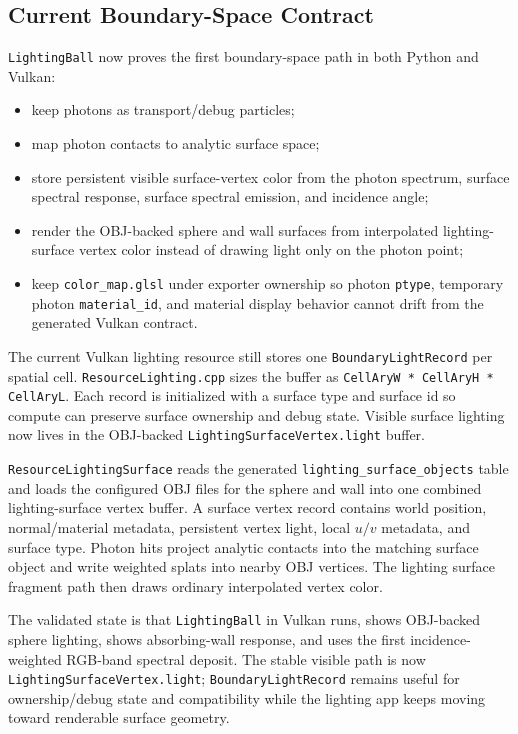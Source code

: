 \subsection{Current Boundary-Space Contract}

\texttt{LightingBall} now proves the first boundary-space path in both Python
and Vulkan:
\begin{itemize}
    \item keep photons as transport/debug particles;
    \item map photon contacts to analytic surface space;
    \item store persistent visible surface-vertex color from the photon
          spectrum, surface spectral response, surface spectral emission, and
          incidence angle;
    \item render the OBJ-backed sphere and wall surfaces from interpolated
          lighting-surface vertex color instead of drawing light only on the
          photon point;
    \item keep \texttt{color\_map.glsl} under exporter ownership so photon
          \texttt{ptype}, temporary photon \texttt{material\_id}, and material
          display behavior cannot drift from the generated Vulkan contract.
\end{itemize}

The current Vulkan lighting resource still stores one
\texttt{BoundaryLightRecord} per spatial cell.  \texttt{ResourceLighting.cpp}
sizes the buffer as \texttt{CellAryW * CellAryH * CellAryL}.  Each record is
initialized with a surface type and surface id so compute can preserve
surface ownership and debug state.  Visible surface lighting now lives in the
OBJ-backed \texttt{LightingSurfaceVertex.light} buffer.

\texttt{ResourceLightingSurface} reads the generated
\texttt{lighting\_surface\_objects} table and loads the configured OBJ files
for the sphere and wall into one combined lighting-surface vertex buffer.  A
surface vertex record contains world position, normal/material metadata,
persistent vertex light, local \(u/v\) metadata, and surface type.  Photon
hits project analytic contacts into the matching surface object and write
weighted splats into nearby OBJ vertices.  The lighting surface fragment path
then draws ordinary interpolated vertex color.

The validated state is that \texttt{LightingBall} in Vulkan runs, shows
OBJ-backed sphere lighting, shows absorbing-wall response, and uses the first
incidence-weighted RGB-band spectral deposit.  The stable visible path is now
\texttt{LightingSurfaceVertex.light}; \texttt{BoundaryLightRecord} remains
useful for ownership/debug state and compatibility while the lighting app
keeps moving toward renderable surface geometry.

